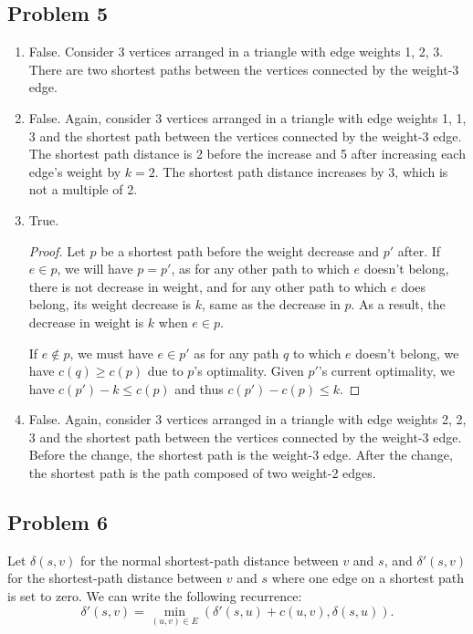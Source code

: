 \documentclass{article}
\begin{document}
\subsection*{Problem 5}

\begin{enumerate}
    \item False. Consider 3 vertices arranged in a triangle with edge weights 1, 2, 3. There are two shortest paths between the vertices connected by the weight-3 edge.
    \item False. Again, consider 3 vertices arranged in a triangle with edge weights 1, 1, 3 and the shortest path between the vertices connected by the weight-3 edge. The shortest path distance is 2 before the increase and 5 after increasing each edge's weight by $k = 2$. The shortest path distance increases by 3, which is not a multiple of 2.
    \item True.
    \begin{proof}
        Let $p$ be a shortest path before the weight decrease and $p'$ after. If $e \in p$, we will have $p = p'$, as for any other path to which $e$ doesn't belong, there is not decrease in weight, and for any other path to which $e$ does belong, its weight decrease is $k$, same as the decrease in $p$. As a result, the decrease in weight is $k$ when $e \in p$.

        If $e \notin p$, we must have $e \in p'$ as for any path $q$ to which $e$ doesn't belong, we have $c(q) \ge c(p)$ due to $p$'s optimality. Given $p'$'s current optimality, we have $c(p') - k \le c(p)$ and thus $c(p') - c(p) \le k$.
    \end{proof}
    \item False. Again, consider 3 vertices arranged in a triangle with edge weights 2, 2, 3 and the shortest path between the vertices connected by the weight-3 edge. Before the change, the shortest path is the weight-3 edge. After the change, the shortest path is the path composed of two weight-2 edges.
\end{enumerate}

\subsection*{Problem 6}

Let $\delta(s, v)$ for the normal shortest-path distance between $v$ and $s$, and $\delta'(s, v)$ for the shortest-path distance between $v$ and $s$ where one edge on a shortest path is set to zero. We can write the following recurrence:
\[
    \delta'(s, v) = \min_{(u, v) \in E}(\delta'(s, u) + c(u, v), \delta(s, u)).
\]
\end{document}

